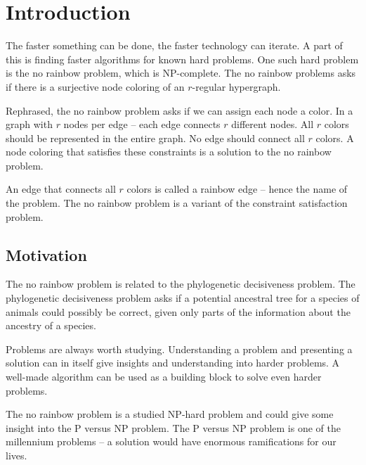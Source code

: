 \documentclass[msc,lith,english]{liuthesis}
\author{Edvard Thörnros}
\begin{document}
\chapter{Introduction}
\label{chaIntro}
The faster something can be done, the faster technology can iterate.
A part of this is finding faster algorithms for known hard problems.
One such hard problem is the no rainbow problem, which is NP-complete.
The no rainbow problems asks if there is a surjective node coloring of an $r$-regular hypergraph.

Rephrased, the no rainbow problem asks if we can assign each node a color.
In a graph with $r$ nodes per edge -- each edge connects $r$ different nodes.
All $r$ colors should be represented in the entire graph.
No edge should connect all $r$ colors.
A node coloring that satisfies these constraints is a solution to the no rainbow problem.

An edge that connects all $r$ colors is called a rainbow edge -- hence the name of the problem.
The no rainbow problem is a variant of the constraint satisfaction problem. \cite{sourceNoRainbow}

\section{Motivation}
The no rainbow problem is related to the phylogenetic decisiveness problem. The
phylogenetic decisiveness problem asks if a potential ancestral tree for a
species of animals could possibly be correct, given only parts of the
information about the ancestry of a species. \cite{sourcePhylogeneticDecisiveness} \cite{sourceNoRainbow}

Problems are always worth studying. Understanding a problem and presenting a
solution can in itself give insights and understanding into harder problems. 
A well-made algorithm can be used as a building block to solve even harder problems.

The no rainbow problem is a studied NP-hard problem and could give some insight into the P versus NP problem.
The P versus NP problem is one of the millennium problems -- a solution would have enormous ramifications for our lives.

\end{document}
